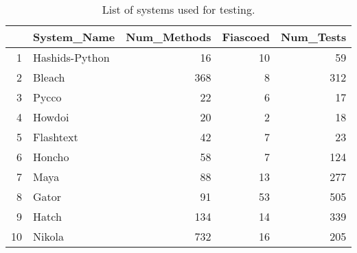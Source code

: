 \begin{table}[H]
\centering
\begin{tabular}{rlrrr}
  \hline
 & System\_Name & Num\_Methods & Fiascoed & Num\_Tests \\
  \hline
1 & Hashids-Python &  16 &  10 &  59 \\
  2 & Bleach & 368 &   8 & 312 \\
  3 & Pycco &  22 &   6 &  17 \\
  4 & Howdoi &  20 &   2 &  18 \\
  5 & Flashtext &  42 &   7 &  23 \\
  6 & Honcho &  58 &   7 & 124 \\
  7 & Maya &  88 &  13 & 277 \\
  8 & Gator &  91 &  53 & 505 \\
  9 & Hatch & 134 &  14 & 339 \\
  10 & Nikola & 732 &  16 & 205 \\
   \hline
\end{tabular}
\caption{List of systems used for testing.}~\label{sysList}
\end{table}
